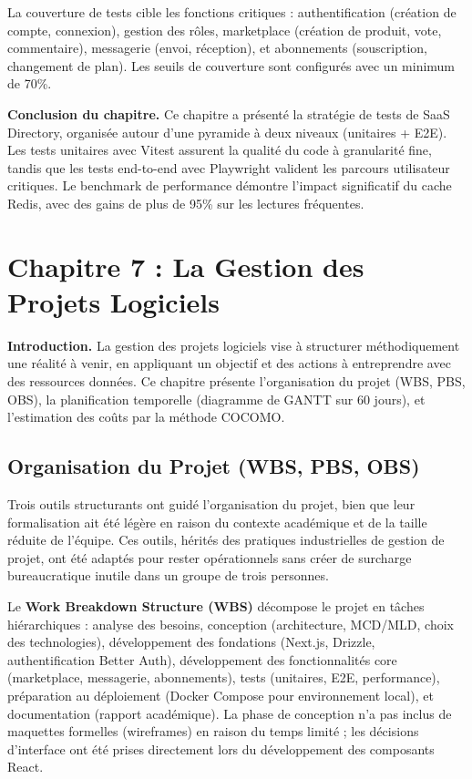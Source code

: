 La couverture de tests cible les fonctions critiques : authentification (création de compte, connexion), gestion des rôles, marketplace (création de produit, vote, commentaire), messagerie (envoi, réception), et abonnements (souscription, changement de plan). Les seuils de couverture sont configurés avec un minimum de 70\%.

\textbf{Conclusion du chapitre.} Ce chapitre a présenté la stratégie de tests de SaaS Directory, organisée autour d'une pyramide à deux niveaux (unitaires + E2E). Les tests unitaires avec Vitest assurent la qualité du code à granularité fine, tandis que les tests end-to-end avec Playwright valident les parcours utilisateur critiques. Le benchmark de performance démontre l'impact significatif du cache Redis, avec des gains de plus de 95\% sur les lectures fréquentes.


\section{Chapitre 7 : La Gestion des Projets Logiciels}

\textbf{Introduction.} La gestion des projets logiciels vise à structurer méthodiquement une réalité à venir, en appliquant un objectif et des actions à entreprendre avec des ressources données. Ce chapitre présente l'organisation du projet (WBS, PBS, OBS), la planification temporelle (diagramme de GANTT sur 60 jours), et l'estimation des coûts par la méthode COCOMO.

\subsection{Organisation du Projet (WBS, PBS, OBS)}

Trois outils structurants ont guidé l'organisation du projet, bien que leur formalisation ait été légère en raison du contexte académique et de la taille réduite de l'équipe. Ces outils, hérités des pratiques industrielles de gestion de projet, ont été adaptés pour rester opérationnels sans créer de surcharge bureaucratique inutile dans un groupe de trois personnes.

Le \textbf{Work Breakdown Structure (WBS)} décompose le projet en tâches hiérarchiques : analyse des besoins, conception (architecture, MCD/MLD, choix des technologies), développement des fondations (Next.js, Drizzle, authentification Better Auth), développement des fonctionnalités core (marketplace, messagerie, abonnements), tests (unitaires, E2E, performance), préparation au déploiement (Docker Compose pour environnement local), et documentation (rapport académique). La phase de conception n'a pas inclus de maquettes formelles (wireframes) en raison du temps limité ; les décisions d'interface ont été prises directement lors du développement des composants React.

